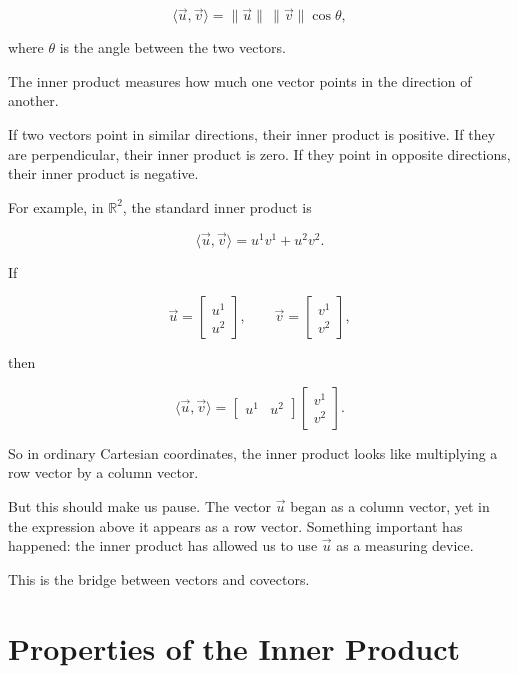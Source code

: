 \documentclass[11pt,openany]{book}
\theoremstyle{definition}
\begin{document}
\[
\langle \vec{u}, \vec{v} \rangle
=
\|\vec{u}\|\,\|\vec{v}\|\cos\theta,
\]

where \(\theta\) is the angle between the two vectors.

\begin{keyidea}
The inner product measures how much one vector points in the direction of
another.
\end{keyidea}

If two vectors point in similar directions, their inner product is positive. If
they are perpendicular, their inner product is zero. If they point in opposite
directions, their inner product is negative.

\medskip

For example, in \(\mathbb{R}^2\), the standard inner product is

\[
\langle \vec{u}, \vec{v} \rangle
=
u^1v^1 + u^2v^2.
\]

If

\[
\vec{u}
=
\begin{bmatrix}
u^1 \\
u^2
\end{bmatrix},
\qquad
\vec{v}
=
\begin{bmatrix}
v^1 \\
v^2
\end{bmatrix},
\]

then

\[
\langle \vec{u}, \vec{v} \rangle
=
\begin{bmatrix}
u^1 & u^2
\end{bmatrix}
\begin{bmatrix}
v^1 \\
v^2
\end{bmatrix}.
\]

So in ordinary Cartesian coordinates, the inner product looks like multiplying a
row vector by a column vector.

But this should make us pause. The vector \(\vec{u}\) began as a column vector,
yet in the expression above it appears as a row vector. Something important has
happened: the inner product has allowed us to use \(\vec{u}\) as a measuring
device.

\medskip

This is the bridge between vectors and covectors.

\section{Properties of the Inner Product}
\end{document}
